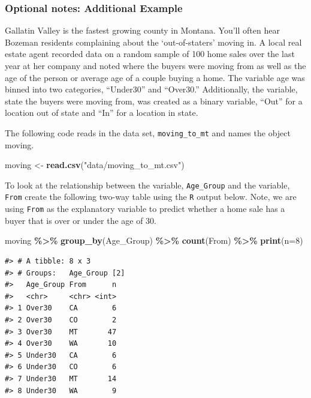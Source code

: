 \documentclass[
]{report}
\newenvironment{Shaded}{\begin{snugshade}}{\end{snugshade}}
\newcommand{\AttributeTok}[1]{\textcolor[rgb]{0.13,0.29,0.53}{#1}}
\newcommand{\DecValTok}[1]{\textcolor[rgb]{0.00,0.00,0.81}{#1}}
\newcommand{\FunctionTok}[1]{\textcolor[rgb]{0.13,0.29,0.53}{\textbf{#1}}}
\newcommand{\NormalTok}[1]{#1}
\newcommand{\OtherTok}[1]{\textcolor[rgb]{0.56,0.35,0.01}{#1}}
\newcommand{\SpecialCharTok}[1]{\textcolor[rgb]{0.81,0.36,0.00}{\textbf{#1}}}
\newcommand{\StringTok}[1]{\textcolor[rgb]{0.31,0.60,0.02}{#1}}
\begin{document}
\subsubsection*{Optional notes: Additional Example}\label{optional-notes-additional-example-8}

Gallatin Valley is the fastest growing county in Montana. You'll often hear Bozeman residents complaining about the `out-of-staters' moving in. A local real estate agent recorded data on a random sample of 100 home sales over the last year at her company and noted where the buyers were moving from as well as the age of the person or average age of a couple buying a home. The variable age was binned into two categories, ``Under30'' and ``Over30.'' Additionally, the variable, state the buyers were moving from, was created as a binary variable, ``Out'' for a location out of state and ``In'' for a location in state.

The following code reads in the data set, \texttt{moving\_to\_mt} and names the object moving.

\begin{Shaded}
\begin{Highlighting}[]
\NormalTok{moving }\OtherTok{\textless{}{-}} \FunctionTok{read.csv}\NormalTok{(}\StringTok{"data/moving\_to\_mt.csv"}\NormalTok{)}
\end{Highlighting}
\end{Shaded}

To look at the relationship between the variable, \texttt{Age\_Group} and the variable, \texttt{From} create the following two-way table using the \texttt{R} output below. Note, we are using \texttt{From} as the explanatory variable to predict whether a home sale has a buyer that is over or under the age of 30.

\begin{Shaded}
\begin{Highlighting}[]
\NormalTok{moving }\SpecialCharTok{\%\textgreater{}\%}
    \FunctionTok{group\_by}\NormalTok{(Age\_Group) }\SpecialCharTok{\%\textgreater{}\%} \FunctionTok{count}\NormalTok{(From) }\SpecialCharTok{\%\textgreater{}\%} \FunctionTok{print}\NormalTok{(}\AttributeTok{n=}\DecValTok{8}\NormalTok{)}
\end{Highlighting}
\end{Shaded}

\begin{verbatim}
#> # A tibble: 8 x 3
#> # Groups:   Age_Group [2]
#>   Age_Group From      n
#>   <chr>     <chr> <int>
#> 1 Over30    CA        6
#> 2 Over30    CO        2
#> 3 Over30    MT       47
#> 4 Over30    WA       10
#> 5 Under30   CA        6
#> 6 Under30   CO        6
#> 7 Under30   MT       14
#> 8 Under30   WA        9
\end{verbatim}
\end{document}
